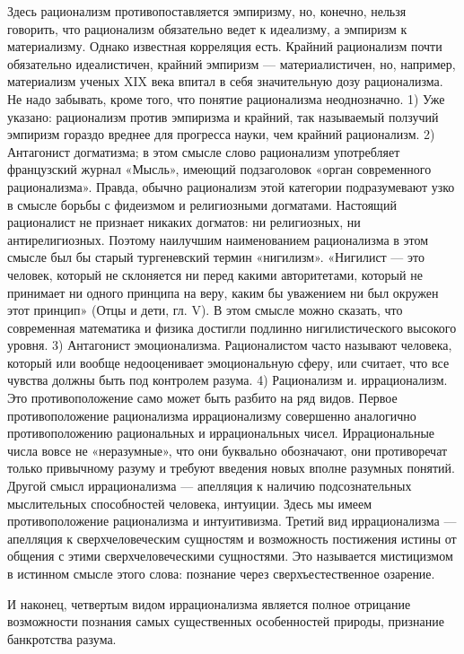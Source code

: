 Здесь рационализм противопоставляется эмпиризму, но, конечно, нельзя
говорить, что рационализм обязательно ведет к идеализму, а эмпиризм к
материализму. Однако известная корреляция есть. Крайний рационализм
почти обязательно идеалистичен, крайний эмпиризм --- материалистичен,
но, например, материализм ученых XIX века впитал в себя значительную
дозу рационализма. Не надо забывать, кроме того, что понятие
рационализма неоднозначно. 1) Уже указано: рационализм против
эмпиризма и крайний, так называемый ползучий эмпиризм гораздо вреднее
для прогресса науки, чем крайний рационализм. 2) Антагонист
догматизма; в этом смысле слово рационализм употребляет французский
журнал «Мысль», имеющий подзаголовок «орган современного
рационализма». Правда, обычно рационализм этой категории подразумевают
узко в смысле борьбы с фидеизмом и религиозными догматами. Настоящий
рационалист не признает никаких догматов: ни религиозных, ни
антирелигиозных. Поэтому наилучшим наименованием рационализма в этом
смысле был бы старый тургеневский термин «нигилизм». «Нигилист --- это
человек, который не склоняется ни перед какими авторитетами, который
не принимает ни одного принципа на веру, каким бы уважением ни был
окружен этот принцип» (Отцы и дети, гл. V). В этом смысле можно
сказать, что современная математика и физика достигли подлинно
нигилистического высокого уровня. 3) Антагонист эмоционализма.
Рационалистом часто называют человека, который или вообще
недооценивает эмоциональную сферу, или считает, что все чувства должны
быть под контролем разума. 4) Рационализм и. иррационализм. Это
противоположение само может быть разбито на ряд видов. Первое
противоположение рационализма иррационализму совершенно аналогично
противоположению рациональных и иррациональных чисел. Иррациональные
числа вовсе не «неразумные», что они буквально обозначают, они
противоречат только привычному разуму и требуют введения новых вполне
разумных понятий. Другой смысл иррационализма --- апелляция к наличию
подсознательных мыслительных способностей человека, интуиции. Здесь мы
имеем противоположение рационализма и интуитивизма. Третий вид
иррационализма --- апелляция к сверхчеловеческим сущностям и
возможность постижения истины от общения с этими сверхчеловеческими
сущностями. Это называется мистицизмом в истинном смысле этого слова:
познание через сверхъестественное озарение.

И наконец, четвертым видом иррационализма является полное отрицание
возможности познания самых существенных особенностей природы,
признание банкротства разума.

